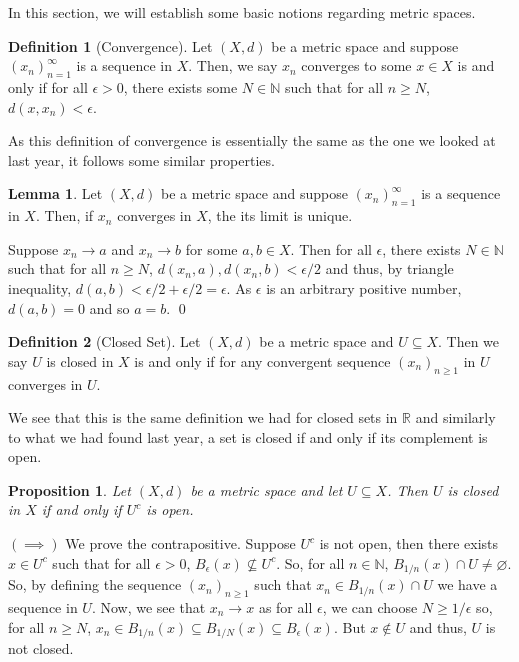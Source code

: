 \documentclass[
]{article}
\newtheorem{prop}{Proposition}
\theoremstyle{definition}
\newtheorem{definition}{Definition}[section]
\newtheorem{lemma}{Lemma}[section]
\begin{document}
In this section, we will establish some basic notions regarding metric
spaces.

\begin{definition}[Convergence]
  Let \((X, d)\) be a metric space and suppose \((x_n)_{n = 1}^\infty\) is a 
  sequence in \(X\). Then, we say \(x_n\) converges to some \(x \in X\) is and 
  only if for all \(\epsilon > 0\), there exists some \(N \in \mathbb{N}\) such 
  that for all \(n \ge N\), \(d(x, x_n) < \epsilon\).
\end{definition}

As this definition of convergence is essentially the same as the one we
looked at last year, it follows some similar properties.

\begin{lemma}
  Let \((X, d)\) be a metric space and suppose \((x_n)_{n = 1}^\infty\) is a 
  sequence in \(X\). Then, if \(x_n\) converges in \(X\), the its limit is unique.
\end{lemma}
\proof

Suppose \(x_n \to a\) and \(x_n \to b\) for some \(a, b \in X\). Then
for all \(\epsilon\), there exists \(N \in \mathbb{N}\) such that for
all \(n \ge N\), \(d(x_n, a), d(x_n, b) < \epsilon / 2\) and thus, by
triangle inequality,
\(d(a, b) < \epsilon / 2 + \epsilon / 2 = \epsilon\). As \(\epsilon\) is
an arbitrary positive number, \(d(a, b) = 0\) and so \(a = b\). \qed

\begin{definition}[Closed Set]
  Let \((X, d)\) be a metric space and \(U \subseteq X\). Then we say \(U\) is 
  closed in \(X\) is and only if for any convergent sequence \((x_n)_{n \ge 1}\) 
  in \(U\) converges in \(U\).
\end{definition}

We see that this is the same definition we had for closed sets in
\(\mathbb{R}\) and similarly to what we had found last year, a set is
closed if and only if its complement is open.

\begin{prop}\label{closed_iff}
  Let \((X, d)\) be a metric space and let \(U \subseteq X\). Then \(U\) is 
  closed in \(X\) if and only if \(U^c\) is open.
\end{prop}
\proof

\((\implies)\) We prove the contrapositive. Suppose \(U^c\) is not open,
then there exists \(x \in U^c\) such that for all \(\epsilon > 0\),
\(B_\epsilon(x) \not\subseteq U^c\). So, for all \(n \in \mathbb{N}\),
\(B_{1 / n}(x) \cap U \neq \varnothing\). So, by defining the sequence
\((x_n)_{n \ge 1}\) such that \(x_n \in B_{1 / n}(x) \cap U\) we have a
sequence in \(U\). Now, we see that \(x_n \to x\) as for all
\(\epsilon\), we can choose \(N \ge 1 / \epsilon\) so, for all
\(n \ge N\),
\(x_n \in B_{1 / n}(x) \subseteq B_{1 / N}(x) \subseteq B_\epsilon (x)\).
But \(x \not\in U\) and thus, \(U\) is not closed.
\end{document}
